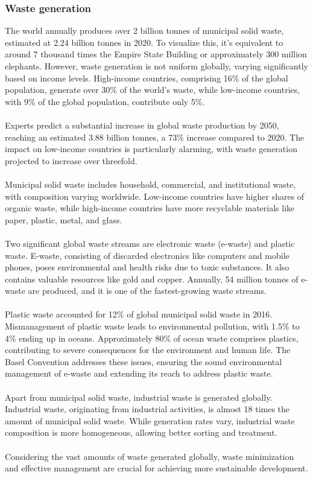 \documentclass[../summary.tex]{subfiles}
\begin{document}
\subsubsection{Waste generation}

The world annually produces over 2 billion tonnes of municipal solid waste, estimated at 2.24 billion tonnes in 2020. To visualize this, it's equivalent to around 7 thousand times the Empire State Building or approximately 300 million elephants. However, waste generation is not uniform globally, varying significantly based on income levels. High-income countries, comprising 16\% of the global population, generate over 30\% of the world's waste, while low-income countries, with 9\% of the global population, contribute only 5\%.\\
\\
Experts predict a substantial increase in global waste production by 2050, reaching an estimated 3.88 billion tonnes, a 73\% increase compared to 2020. The impact on low-income countries is particularly alarming, with waste generation projected to increase over threefold.\\
\\
Municipal solid waste includes household, commercial, and institutional waste, with composition varying worldwide. Low-income countries have higher shares of organic waste, while high-income countries have more recyclable materials like paper, plastic, metal, and glass.\\
\\
Two significant global waste streams are electronic waste (e-waste) and plastic waste. E-waste, consisting of discarded electronics like computers and mobile phones, poses environmental and health risks due to toxic substances. It also contains valuable resources like gold and copper. Annually, 54 million tonnes of e-waste are produced, and it is one of the fastest-growing waste streams.\\
\\
Plastic waste accounted for 12\% of global municipal solid waste in 2016. Mismanagement of plastic waste leads to environmental pollution, with 1.5\% to 4\% ending up in oceans. Approximately 80\% of ocean waste comprises plastics, contributing to severe consequences for the environment and human life. The Basel Convention addresses these issues, ensuring the sound environmental management of e-waste and extending its reach to address plastic waste.\\
\\
Apart from municipal solid waste, industrial waste is generated globally. Industrial waste, originating from industrial activities, is almost 18 times the amount of municipal solid waste. While generation rates vary, industrial waste composition is more homogeneous, allowing better sorting and treatment.\\
\\
Considering the vast amounts of waste generated globally, waste minimization and effective management are crucial for achieving more sustainable development.
\end{document}
